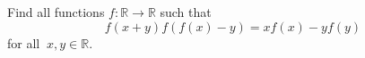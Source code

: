 Find all functions $ f : \mathbb{R} \to \mathbb{R}$ such that \[ f(x+y)f(f(x)-y)=xf(x)-yf(y)\]for all $ \ x,y \in \mathbb{R}.$